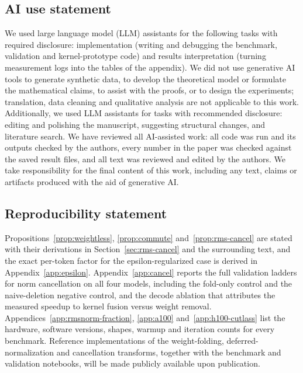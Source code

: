 \documentclass{article}
\begin{document}
\subsection*{AI use statement}
We used large language model (LLM) assistants for the following tasks with
required disclosure: implementation (writing and debugging the benchmark,
validation and kernel-prototype code) and results interpretation (turning
measurement logs into the tables of the appendix). We did not use generative AI
tools to generate synthetic data, to develop the theoretical model or formulate
the mathematical claims, to assist with the proofs, or to design the experiments;
translation, data cleaning and qualitative analysis are not applicable to this
work. Additionally, we used LLM assistants for tasks with recommended disclosure:
editing and polishing the manuscript, suggesting structural changes, and
literature search. We have reviewed all AI-assisted work: all code was run and
its outputs checked by the authors, every number in the paper was checked against
the saved result files, and all text was reviewed and edited by the authors. We
take responsibility for the final content of this work, including any text, claims or
artifacts produced with the aid of generative AI.

\subsection*{Reproducibility statement}
Propositions~\ref{prop:weightless}, \ref{prop:commute} and~\ref{prop:rms-cancel}
are stated with their derivations in Section~\ref{sec:rms-cancel} and the
surrounding text, and the exact per-token factor for the epsilon-regularized case
is derived in Appendix~\ref{app:epsilon}. Appendix~\ref{app:cancel} reports the
full validation ladders for norm cancellation on all four models, including the
fold-only control and the naive-deletion negative control, and the decode
ablation that attributes the measured speedup to kernel fusion versus weight
removal. Appendices~\ref{app:rmsnorm-fraction}, \ref{app:a100}
and~\ref{app:h100-cutlass} list the hardware, software versions, shapes, warmup
and iteration counts for every benchmark. Reference implementations of the
weight-folding, deferred-normalization and cancellation transforms, together with
the benchmark and validation notebooks, will be made publicly available upon
publication.




\appendix
\end{document}
